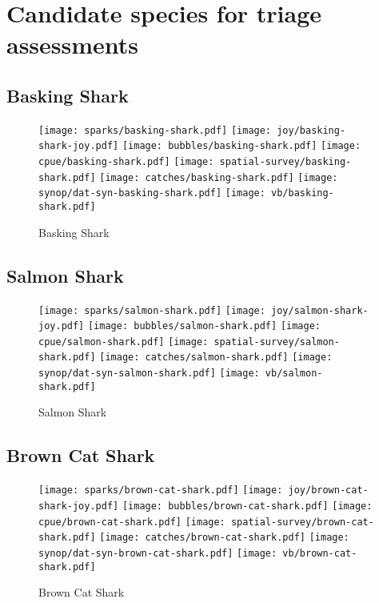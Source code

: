 \section*{Candidate species for triage assessments}
\subsection*{Basking Shark}

\begin{figure}[htbp]
\centering
\texttt{[image: sparks/basking-shark.pdf]}
\texttt{[image: joy/basking-shark-joy.pdf]}
\texttt{[image: bubbles/basking-shark.pdf]}
\texttt{[image: cpue/basking-shark.pdf]}
\texttt{[image: spatial-survey/basking-shark.pdf]}
\texttt{[image: catches/basking-shark.pdf]}
\texttt{[image: synop/dat-syn-basking-shark.pdf]}
\texttt{[image: vb/basking-shark.pdf]}
\caption{Basking Shark}
\end{figure}
\clearpage
\subsection*{Salmon Shark}

\begin{figure}[htbp]
\centering
\texttt{[image: sparks/salmon-shark.pdf]}
\texttt{[image: joy/salmon-shark-joy.pdf]}
\texttt{[image: bubbles/salmon-shark.pdf]}
\texttt{[image: cpue/salmon-shark.pdf]}
\texttt{[image: spatial-survey/salmon-shark.pdf]}
\texttt{[image: catches/salmon-shark.pdf]}
\texttt{[image: synop/dat-syn-salmon-shark.pdf]}
\texttt{[image: vb/salmon-shark.pdf]}
\caption{Salmon Shark}
\end{figure}
\clearpage
\subsection*{Brown Cat Shark}

\begin{figure}[htbp]
\centering
\texttt{[image: sparks/brown-cat-shark.pdf]}
\texttt{[image: joy/brown-cat-shark-joy.pdf]}
\texttt{[image: bubbles/brown-cat-shark.pdf]}
\texttt{[image: cpue/brown-cat-shark.pdf]}
\texttt{[image: spatial-survey/brown-cat-shark.pdf]}
\texttt{[image: catches/brown-cat-shark.pdf]}
\texttt{[image: synop/dat-syn-brown-cat-shark.pdf]}
\texttt{[image: vb/brown-cat-shark.pdf]}
\caption{Brown Cat Shark}
\end{figure}
\clearpage
